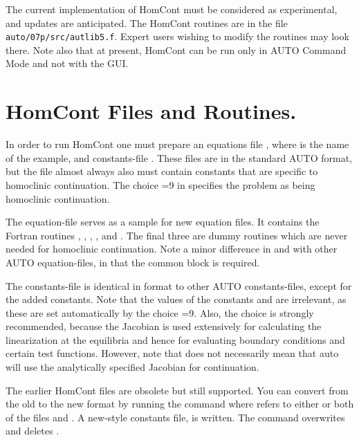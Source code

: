 \documentclass[12pt]{report}
\begin{document}
The current implementation of {\cal HomCont} must be considered as experimental,
and updates are anticipated.
The {\cal HomCont} routines are in the file {\tt auto/07p/src/autlib5.f}. 
Expert users wishing to modify the routines may look there.
Note also that at present, {\cal HomCont} can be run only in 
{\cal AUTO} Command Mode and not with the GUI. 


\section{{\cal HomCont} Files and Routines.} \label{sec:HomCont_files}

In order to run {\cal HomCont} one must prepare an equations file , 
where  is the name of the example, 
and constants-file .
These files are in the standard {\cal AUTO} format, but
the  file almost always also must
contain constants that are specific to homoclinic continuation.
The choice =9 in  specifies the problem as
being homoclinic continuation.

The equation-file  serves as a sample for new equation
files. It contains the Fortran routines 
, , , ,  
and . The final three are
dummy routines which are never needed for homoclinic continuation.
Note a minor difference in  and  with other 
{\cal AUTO} equation-files, in that the common block 
 is required.

The constants-file  is identical in format to other
{\cal AUTO} constants-files, except for the added constants.
Note that the values of the constants
 and  are irrelevant, as these are set
automatically by the choice =9. Also, the choice 
is strongly recommended, because the Jacobian is used extensively for
calculating the linearization at the equilibria and hence for
evaluating boundary conditions and certain test functions. However,
note that  does not necessarily mean that {\cal auto} will
use the analytically specified Jacobian for continuation.

The earlier HomCont files  are obsolete but still
supported. You can convert from the old to the new format by running
the command  where  refers to either
or both of the files  and . A new-style
constants file,  is written. The command
 overwrites  and deletes .
\end{document}

